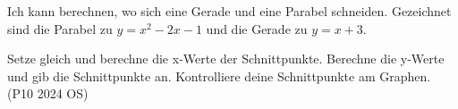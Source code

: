 \begin{aufgabe}{Ich kann berechnen, wo sich eine Gerade und eine Parabel schneiden.}
Gezeichnet sind die Parabel zu $y = x^2 - 2x - 1$ und die Gerade zu $y = x + 3$.

\begin{ksys}[xmin=-3,xmax=6,ymin=-3,ymax=8,ablesen]
\end{ksys}

\begin{teile}
\teil Setze gleich und berechne die x-Werte der Schnittpunkte.
\teil Berechne die y-Werte und gib die Schnittpunkte an.
\teil Kontrolliere deine Schnittpunkte am Graphen. \hfill (P10 2024 OS)
\end{teile}
\end{aufgabe}
